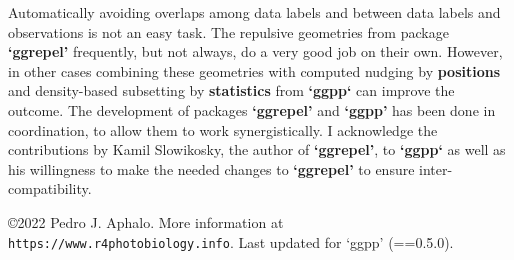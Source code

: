 \documentclass[DIV=21,a3,landscape,9pt]{scrartcl}\usepackage[]{graphicx}\usepackage[]{xcolor}
\begin{document}
\begin{multicols}{3}
Automatically avoiding overlaps among data labels and between data labels and observations is not an easy task. The repulsive geometries from package \textbf{`ggrepel'} frequently, but not always, do a very good job on their own. However, in other cases combining these geometries with computed nudging by \textbf{positions} and density-based subsetting by \textbf{statistics} from \textbf{`ggpp`} can improve the outcome. The development of packages \textbf{`ggrepel'} and \textbf{`ggpp'} has been done in coordination, to allow them to work synergistically. I acknowledge the contributions by Kamil Slowikosky, the author of \textbf{`ggrepel'}, to \textbf{`ggpp`} as well as his willingness to make the needed changes to \textbf{`ggrepel'} to ensure inter-compatibility.

\end{multicols}
\vfill
\centering
\noindent
\copyright 2022 Pedro J. Aphalo. More information at \texttt{https://www.r4photobiology.info}. Last updated for `ggpp' (==0.5.0).
\end{document}

